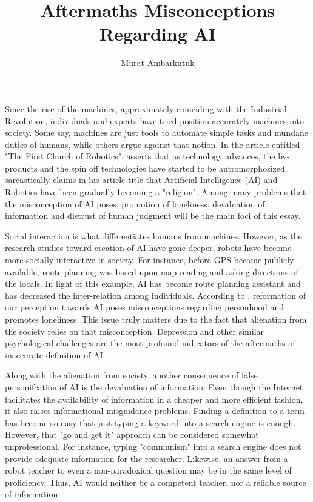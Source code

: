 \documentclass[man]{apa6}
\title{Aftermaths Misconceptions Regarding AI}
\author{Murat Ambarkutuk}
\affiliation{English Language Institute, University of Delaware \\ murata@udel.edu}
\begin{document}
\maketitle
Since the rise of the machines, approximately coinciding with the Industrial Revolution, individuals and experts have tried position accurately machines into society. Some say, machines are just tools to automate simple tasks and mundane duties of humans, while others argue against that notion. In the article entitled "The First Church of Robotics",  asserts that as technology advances, the by-products and the spin off technologies have started to be antromorphosized.  sarcastically claims in his article title that Artificial Intelligence (AI)  and Robotics have been gradually becoming a "religion". Among many problems that the misconception of AI poses, promotion of loneliness, devaluation of information and distrust of human judgment will be the main foci of this essay.\par
Social interaction is what differentiates humans from machines. However, as the research studies toward creation of AI have gone deeper, robots have become more socially interactive in society. For instance, before GPS became publicly available, route planning was based upon map-reading and asking directions of the locals. In light of this example, AI has become route planning assistant and has decreased the inter-relation among individuals. According to , reformation of our perception towards AI poses misconceptions regarding personhood and promotes loneliness. This issue truly matters due to the fact that alienation from the society relies on that misconception. Depression and other similar psychological challenges are the most profound indicators of the aftermaths of inaccurate definition of AI.\par
Along with the alienation from society, another consequence of false personifcation of AI is the devaluation of information. Even though the Internet facilitates the availability of information in a cheaper and more efficient fashion, it also raises informational misguidance problems. Finding a definition to a term has become so easy that just typing a keyword into a search engine is enough. However, that "go and get it" approach can be considered somewhat unprofessional. For instance, typing "communism" into a search engine does not provide adequate information for the researcher. Likewise, an answer from a robot teacher to even a non-paradoxical question may be in the same level of proficiency. Thus, AI would neither be a competent teacher, nor a reliable source of information.\par
\end{document}
